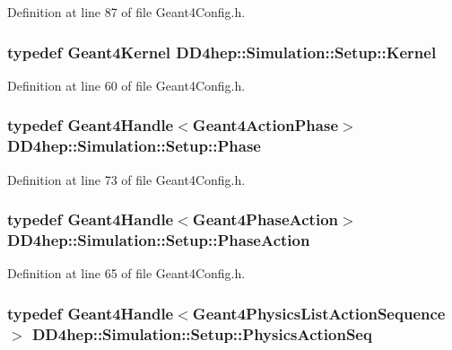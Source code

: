 Definition at line 87 of file Geant4Config.h.\hypertarget{namespace_d_d4hep_1_1_simulation_1_1_setup_a463a13fee8e841935ffc1c013755240e}{
\subsubsection[{Kernel}]{\setlength{\rightskip}{0pt plus 5cm}typedef {\bf Geant4Kernel} {\bf DD4hep::Simulation::Setup::Kernel}}}
\label{namespace_d_d4hep_1_1_simulation_1_1_setup_a463a13fee8e841935ffc1c013755240e}


Definition at line 60 of file Geant4Config.h.\hypertarget{namespace_d_d4hep_1_1_simulation_1_1_setup_a088b816eb9fc39c4188455b8a5769632}{
\subsubsection[{Phase}]{\setlength{\rightskip}{0pt plus 5cm}typedef {\bf Geant4Handle}$<${\bf Geant4ActionPhase}$>$ {\bf DD4hep::Simulation::Setup::Phase}}}
\label{namespace_d_d4hep_1_1_simulation_1_1_setup_a088b816eb9fc39c4188455b8a5769632}


Definition at line 73 of file Geant4Config.h.\hypertarget{namespace_d_d4hep_1_1_simulation_1_1_setup_a2dad27b7db15a1ff3882c15d5182eb2b}{
\subsubsection[{PhaseAction}]{\setlength{\rightskip}{0pt plus 5cm}typedef {\bf Geant4Handle}$<${\bf Geant4PhaseAction}$>$ {\bf DD4hep::Simulation::Setup::PhaseAction}}}
\label{namespace_d_d4hep_1_1_simulation_1_1_setup_a2dad27b7db15a1ff3882c15d5182eb2b}


Definition at line 65 of file Geant4Config.h.\hypertarget{namespace_d_d4hep_1_1_simulation_1_1_setup_a4a1525b46f6b47a7c7654bf3b79ea3ce}{
\subsubsection[{PhysicsActionSeq}]{\setlength{\rightskip}{0pt plus 5cm}typedef {\bf Geant4Handle}$<${\bf Geant4PhysicsListActionSequence}$>$ {\bf DD4hep::Simulation::Setup::PhysicsActionSeq}}}
\label{namespace_d_d4hep_1_1_simulation_1_1_setup_a4a1525b46f6b47a7c7654bf3b79ea3ce}



